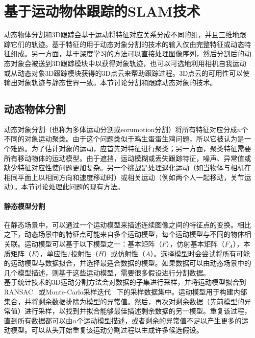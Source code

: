 \section{基于运动物体跟踪的SLAM技术}
\label{subsec:object_tracking}

动态物体分割和3D跟踪会基于运动将特征对应关系分成不同的组，并且三维地跟踪它们的轨迹。基于特征的用于动态对象分割的技术的输入仅由完整特征或动态特征组成。另一方面，基于深度学习的方法可以直接处理图像序列，然后分割后的动态对象会被送到3D跟踪模块中以获得对象轨迹，也可以可选地利用相机自我运动或从动态对象3D跟踪模块获得的3D点云来帮助跟踪过程。3D点云的可用性可以使输出对象轨迹与静态世界一致。本节讨论分割和跟踪动态对象的技术。

\subsection{动态物体分割}
动态对象分割（也称为多体运动分割或eorumotion分割）将所有特征对应分成$n$个不同的对象运动聚类。由于这个问题类似于鸡生蛋蛋生鸡问题，所以它被认为是一个难题。为了估计对象的运动，应首先对特征进行聚类；另一方面，聚类特征需要所有移动物体的运动模型。由于遮挡，运动模糊或丢失跟踪特征，噪声、异常值或缺少特征对应性使问题更加复杂。另一个挑战是处理退化运动（如当物体与相机在相同平面上以相同方向和速度移动时）或相关运动（例如两个人一起移动，关节运动）。本节讨论处理此问题的现有方法。

\paragraph{静态模型分割}
在静态场景中，可以通过一个运动模型来描述连续图像之间的特征点的变换。相比之下，动态场景中的特征点可能来自多个运动模型，每个运动模型与不同的物体相关联。运动模型可以基于以下模型之一：基本矩阵（$F$），仿射基本矩阵（$F_A$），本质矩阵（$E$），单应性/投射性（$H$）或仿射性（$A$）。选择模型时会尝试将所有可能的运动模型与数据拟合，并选择最适合数据的模型。如果数据可以由动态场景中的几个模型描述，则基于这些运动模型，需要很多假设进行分割数据。\\

基于统计技术的3D运动分割方法会对数据的子集进行采样，并将运动模型拟合到RANSAC~\cite{fischler1981random}
或Monte-Carlo采样迭代~\cite{schindler2006two}
下的采样数据集中。运动模型用于构建内部集合，并将剩余数据排除为模型的异常值。然后，再次对剩余数据（先前模型的异常值）进行采样，以找到并拟合能够最佳描述剩余数据的另一模型。重复该过程，直到所有数据都可以由$n$个运动模型描述，或者剩余的异常值不足以产生更多的运动模型。可以从头开始重复该运动分割过程以生成许多候选假设。\\

